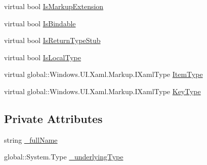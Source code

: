 \begin{DoxyCompactItemize}
\item 
virtual bool \hyperlink{class_eli_log_in_app_1_1_eli_log_in_app___xaml_type_info_1_1_xaml_system_base_type_a43c77ee2e5b556b582c612f9ef04a57a}{Is\+Markup\+Extension}
\item 
virtual bool \hyperlink{class_eli_log_in_app_1_1_eli_log_in_app___xaml_type_info_1_1_xaml_system_base_type_a4c96bea1d2c301cb99e282f774bc006c}{Is\+Bindable}
\item 
virtual bool \hyperlink{class_eli_log_in_app_1_1_eli_log_in_app___xaml_type_info_1_1_xaml_system_base_type_a31b98071fb7b50d254ff759f888b8ac3}{Is\+Return\+Type\+Stub}
\item 
virtual bool \hyperlink{class_eli_log_in_app_1_1_eli_log_in_app___xaml_type_info_1_1_xaml_system_base_type_a63899d6f5e3fc6660940c88b266854ad}{Is\+Local\+Type}
\item 
virtual global\+::\+Windows.\+U\+I.\+Xaml.\+Markup.\+I\+Xaml\+Type \hyperlink{class_eli_log_in_app_1_1_eli_log_in_app___xaml_type_info_1_1_xaml_system_base_type_aff226beb8e18d9b6f6a968d8a7cec7fc}{Item\+Type}
\item 
virtual global\+::\+Windows.\+U\+I.\+Xaml.\+Markup.\+I\+Xaml\+Type \hyperlink{class_eli_log_in_app_1_1_eli_log_in_app___xaml_type_info_1_1_xaml_system_base_type_a5176e8e4b099640be5640b752ca86a11}{Key\+Type}
\end{DoxyCompactItemize}
\subsection*{Private Attributes}
\begin{DoxyCompactItemize}
\item 
string \hyperlink{class_eli_log_in_app_1_1_eli_log_in_app___xaml_type_info_1_1_xaml_system_base_type_a6ff6c296ac37c45c6f0e80598be6076b}{\+\_\+full\+Name}
\item 
global\+::\+System.\+Type \hyperlink{class_eli_log_in_app_1_1_eli_log_in_app___xaml_type_info_1_1_xaml_system_base_type_a6eca71a0a80a16848fefa7e278d36af1}{\+\_\+underlying\+Type}
\end{DoxyCompactItemize}


